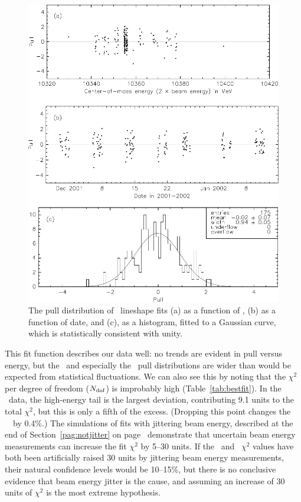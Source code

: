 \documentclass{cornell}
\begin{document}
\begin{figure}[p]
  \begin{center}
    \includegraphics[width=\linewidth]{plots/pullsthree}
  \end{center}
  \caption[Pull distributions for \usss]{\label{pullsthree} The pull distribution of \usss\
  lineshape fits (a) as a function of \ecm, (b) as a function of date,
  and (c), as a histogram, fitted to a Gaussian curve, which is
  statistically consistent with unity.}
\end{figure}

This fit function describes our data well: no trends are evident in
pull versus energy, but the \us\ and especially the \uss\ pull
distributions are wider than would be expected from statistical
fluctuations.  We can also see this by noting that the $\chi^2$ per
degree of freedom ($N_{\mbox{\scriptsize dof}}$) is improbably high
(Table~\ref{tab:bestfit}).  In the \uss\ data, the high-energy tail is
the largest deviation, contributing 9.1 units to the total $\chi^2$,
but this is only a fifth of the excess.  (Dropping this point changes
the \uss\ \geehadtot\ by 0.4\%.)  The simulations of fits with
jittering beam energy, described at the end of
Section~\ref{pag:notjitter} on page~\pageref{pag:notjitter}
demonstrate that uncertain beam energy measurements can increase the
fit $\chi^2$ by 5--30 units.  If the \us\ and \uss\ $\chi^2$ values
have both been artificially raised 30 units by jittering beam energy
measurements, their natural confidence levels would be 10--15\%, but
there is no conclusive evidence that beam energy jitter is the cause,
and assuming an increase of 30 units of $\chi^2$ is the most extreme
hypothesis.
\end{document}
